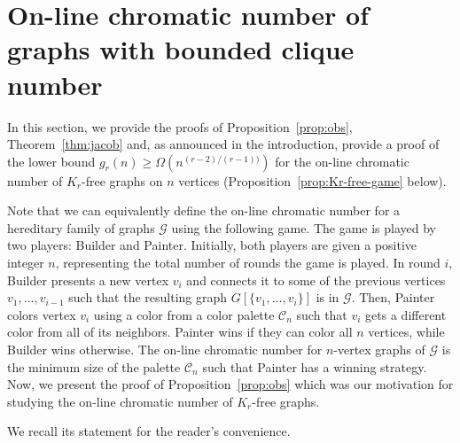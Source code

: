 \documentclass[10pt]{amsart}
\theoremstyle{definition}
\newcommand{\cC}{\mathcal{C}}
\newcommand{\calG}{\mathcal{G}}
\begin{document}
\section{On-line chromatic number of graphs with bounded clique number}\label{sec:online}
In this section, we provide the proofs of Proposition~\ref{prop:obs}, Theorem~\ref{thm:jacob} and, as announced in the introduction, provide a proof of the lower bound $g_r(n)\ge \Omega(n^{(r-2)/(r-1))})$ for the on-line chromatic number of $K_r$-free graphs on $n$ vertices (Proposition~\ref{prop:Kr-free-game} below). 

Note that we can equivalently define the on-line chromatic number for a hereditary family of graphs $\calG$ using the following game. The game is played by two players: Builder and Painter. Initially, both players are given a positive integer $n$, representing the total number of rounds the game is played. In round $i$, Builder presents a new vertex $v_i$ and connects it to some of the previous vertices $v_1, \dots, v_{i-1}$ such that the resulting graph $G[\{ v_1, \dots, v_i\}]$ is in $\calG$. Then, Painter colors vertex $v_i$ using a color from a color palette $\cC_n$ such that $v_i$ gets a different color from all of its neighbors. Painter wins if they can color all $n$ vertices, while Builder wins otherwise. The on-line chromatic number for $n$-vertex graphs of $\calG$ is the minimum size of the palette $\cC_n$ such that Painter has a winning strategy. Now, we present the proof of Proposition~\ref{prop:obs} which was our motivation for studying the on-line chromatic number of $K_r$-free graphs.

We recall its statement for the reader's convenience.
\end{document}
